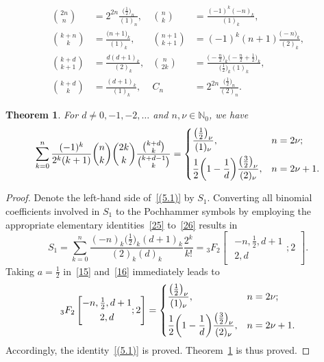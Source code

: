 \documentclass[10pt,a4paper]{amsart}
\newtheorem{thm}{Theorem}
\begin{document}
\begin{align}\label{25}
\binom{2n}{n}&=2^{2n}\frac{\bigl(\frac{1}{2}\bigr)_n}{(1)_n}, & \binom{n}{k}&=\frac{(-1)^k(-n)_k}{(1)_k},\\
\label{27}
\binom{k+n}{k}&=\frac{\bigl(n+1\bigr)_k}{(1)_k}, & \binom{n+1}{k+1}&=(-1)^k(n+1)\frac{\bigl(-n\bigr)_k}{(2)_k},\\
\label{29}
\binom{k+d}{k+1}&=\frac{d(d+1)_k}{(2)_k}, & \binom{n}{2k}&=\frac{\bigl(-\frac{n}2\bigr)_k\bigl(-\frac{n}2+\frac12\bigr)_k}{\bigl(\frac12\bigr)_k(1)_k},\\
\label{26}
\binom{k+d}{k}&=\frac{(d+1)_k}{(1)_k}, & C_n&=2^{2n}\frac{\bigl(\frac{1}{2}\bigr)_n}{(2)_n}.
\end{align}

\begin{thm}\label{5.1thm}
For $d \neq 0,-1,-2,\dotsc$ and $n,\nu \in \mathbb{N}_0$, we have
\begin{equation}\label{(5.1)}
\sum_{k=0}^{n}\frac{(-1)^k}{2^k(k+1)}
\binom{n}{k}\binom{2k}{k}
\frac{\binom{k+d}{k}}{\binom{k+d-1}{k}}
=
\begin{dcases}
\frac{\bigl(\frac12\bigr)_\nu}{(1)_\nu}, & n=2\nu; \\
\frac12\biggl(1-\frac{1}{d}\biggr)
\frac{\bigl(\frac32\bigr)_\nu}{(2)_\nu}, & n=2\nu+1.
\end{dcases}
\end{equation}
\end{thm}

\begin{proof}
Denote the left-hand side of~\eqref{(5.1)} by $S_1$. Converting all binomial coefficients involved in $S_1$ to the Pochhammer symbols by employing the appropriate elementary identities~\eqref{25} to~\eqref{26} results in
\[
S_1
= \sum_{k=0}^{n}
\frac{(-n)_k\bigl(\frac12\bigr)_k(d+1)_k}{(2)_k(d)_k}\frac{2^k}{k!}
= {}_3F_2
\begin{bmatrix}
\begin{gathered}-n,\tfrac12,d+1 \\
2,d\end{gathered}; 2
\end{bmatrix}.
\]
Taking $a=\frac12$ in~\eqref{15} and~\eqref{16} immediately leads to
\[
{}_3F_2\begin{bmatrix}\begin{gathered}-n, \tfrac{1}{2}, d+1\\
2,d\end{gathered};2\end{bmatrix}
=
\begin{dcases}
\frac{\bigl(\frac12\bigr)_\nu}{(1)_\nu}, & n=2\nu; \\
\frac12\biggl(1-\frac{1}{d}\biggr)
\frac{\bigl(\frac32\bigr)_\nu}{(2)_\nu}, & n=2\nu+1.
\end{dcases}
\]
Accordingly, the identity~\eqref{(5.1)} is proved. Theorem~\ref{5.1thm} is thus proved.
\end{proof}
\end{document}
